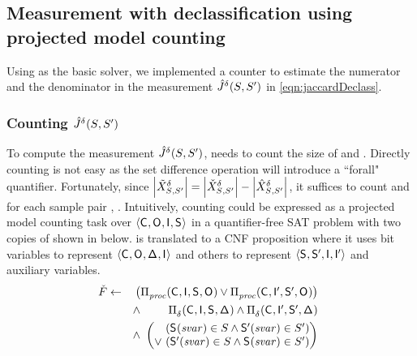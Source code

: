 \subsection{Measurement with declassification using projected model
  counting} 
\label{dinome:sec:impl:counter}
Using \cryptominisat as the basic solver, we
implemented a counter to estimate the numerator and the denominator in
the measurement $\hat{J}^{\delta_{\mbox{}}}_{}(S_{},
S_{}')$ in \eqref{eqn:jaccardDeclass}.

\subsubsection{Counting $\hat{J}^{\delta_{\mbox{}}}_{}(S_{}, S_{}')$}
To compute the measurement $\hat{J}^{\delta_{\mbox{}}}_{}(S_{},
S_{}')$, \thirdsysname needs to count the size of
\possibleTriplesDiffWithDeclass{\secretsSet{}}{\secretsSetAlt{}} and
\possibleTriplesUnionWithDeclass{\secretsSet{}}{\secretsSetAlt{}}.
Directly counting
\possibleTriplesDiffWithDeclass{\secretsSet{}}{\secretsSetAlt{}} is
not easy as the set difference operation will introduce a ``forall"
quantifier.  Fortunately, since
$\left|{\tilde{X}^{\delta}_{{S_{}},{S_{}'}}}\right|=
\left|{\check{X}^{\delta}_{{S_{}},{S_{}'}}}\right|-
\left|{\hat{X}^{\delta}_{{S_{}},{S_{}'}}}\right|$,
it suffices to count
\possibleTriplesUnionWithDeclass{\secretsSet{}}{\secretsSetAlt{}} and
\possibleTriplesIntersectWithDeclass{\secretsSet{}}{\secretsSetAlt{}}
for each sample pair \secretsSet{}, \secretsSetAlt{}. Intuitively,
counting
\possibleTriplesUnionWithDeclass{\secretsSet{}}{\secretsSetAlt{}}
could be expressed as a projected model counting task over
$\langle\mathsf{C}_{}, \mathsf{O}_{}, \mathsf{I}_{}, \mathsf{S}_{}\rangle$ in a
quantifier-free SAT problem with two copies of \postcondition{\proc}{}
shown in \satPropUnion below.  \satPropUnion is translated to a CNF
proposition where it uses \satVars bit variables
to represent $\langle\mathsf{C}_{}, \mathsf{O}_{}, \mathsf{\Delta}_{}, \mathsf{I}_{}\rangle$ and
others to represent $\langle \mathsf{S}_{}, \mathsf{S}'_{}, \mathsf{I}_{},
\mathsf{I}'_{}\rangle$ and
auxiliary variables.
\begin{align}
\begin{array}{@{}rr}
\satPropUnion\leftarrow
&\left(\postcondition{\proc}{}(\ACIFn{}, \AIIFn{}, \SecFn{}, \AOOFn{})
\vee
\postcondition{\proc}{}(\ACIFn{}, \AIIFnAlt{}, \SecFnAlt{}, \AOOFn{}) 
\right)\\[4pt]
&\wedge~\hfill
\postcondition{\declassify{}}{}(\ACIFn{}, \AIIFn{}, \SecFn{}, \DCFn{})
\wedge 
\postcondition{\declassify{}}{}(\ACIFn{}, \AIIFnAlt{}, \SecFnAlt{}, \DCFn{})\\[4pt]
&\wedge~\hfill
\left(\begin{array}{@{}r@{}}
(\SecFn{}(\SecVar)\in \secretsSet{}
\wedge
\SecFnAlt{}(\SecVar)\in\secretsSetAlt{}) \\
\vee~
(\SecFnAlt{}(\SecVar)\in \secretsSet{}
\wedge
\SecFn{}(\SecVar)\in\secretsSetAlt{})
\end{array}\right)
\end{array}
\label{eqn:jaccardDeclass:union:imp} 
\end{align}
